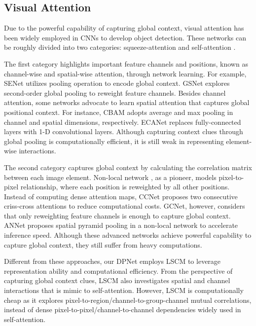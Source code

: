 \documentclass[lettersize,journal]{IEEEtran}
\begin{document}
\subsection{Visual Attention}

Due to the powerful capability of capturing global context, visual attention \cite{hu2018squeeze,ecanet,gao2019global,vaswani2017attention} has been widely employed in CNNs to develop object detection. These networks can be roughly divided into two categories: squeeze-attention \cite{hu2018squeeze,cao2019gcnet,woo2018cbam} and self-attention \cite{vaswani2017attention,wang2018non,liu2021Swin}. 

The first category highlights important feature channels and positions, known as channel-wise and spatial-wise attention, through network learning. For example, SENet \cite{hu2018squeeze} utilizes pooling operation to encode global context. GSNet \cite{gao2019global} explores second-order global pooling to reweight feature channels. Besides channel attention, some networks \cite{hu2018genet,woo2018cbam} advocate to learn spatial attention that captures global positional context. For instance, CBAM\cite{woo2018cbam} adopts average and max pooling in channel and spatial dimensions, respectively. ECANet\cite{ecanet} replaces fully-connected layers with 1-D convolutional layers. Although capturing context clues through global pooling is computationally efficient, it is still weak in representing element-wise interactions.



The second category captures global context by calculating the correlation matrix between each image element. Non-local network \cite{wang2018non}, as a pioneer, models pixel-to-pixel relationship, where each position is reweighted by all other positions. Instead of computing dense attention maps, CCNet\cite{huang2019ccnet} proposes two consecutive criss-cross attentions to reduce computational costs. GCNet\cite{cao2019gcnet}, however, considers that only reweighting feature channels is enough to capture global context. ANNet \cite{zhu2019asymmetric} proposes spatial pyramid pooling in a non-local network to accelerate inference speed. Although these advanced networks achieve powerful capability to capture global context, they still suffer from heavy computations.



Different from these approaches, our DPNet employs LSCM to leverage representation ability and computational efficiency. From the perspective of capturing global context clues, LSCM also investigates spatial and channel interactions that is mimic to self-attention. However, LSCM is computationally cheap as it explores pixel-to-region/channel-to-group-channel mutual correlations, instead of dense pixel-to-pixel/channel-to-channel dependencies widely used in self-attention.
\end{document}
